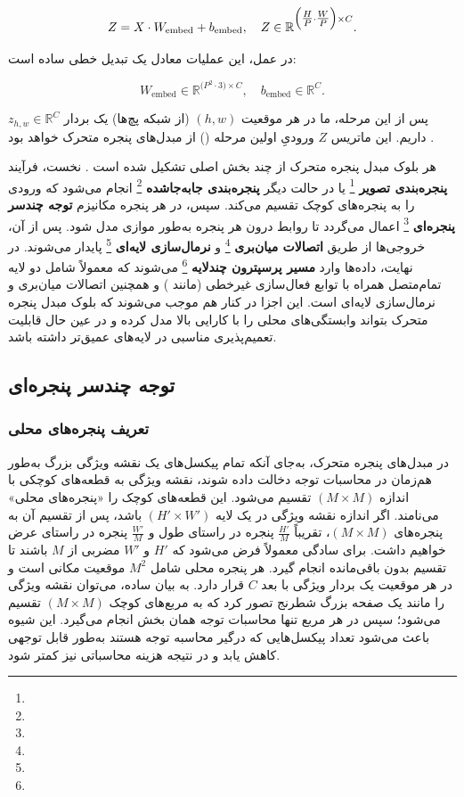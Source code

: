 \begin{equation}
	Z = X \cdot W_{\text{embed}} + b_{\text{embed}},
	\quad
	Z \in \mathbb{R}^{\Bigl(\tfrac{H}{P} \cdot \tfrac{W}{P}\Bigr) \times C}.
\end{equation}

در عمل، این عملیات معادل یک تبدیل خطی ساده است:

\[
W_{\text{embed}} \in \mathbb{R}^{\bigl(P^2 \cdot 3\bigr) \times C},
\quad
b_{\text{embed}} \in \mathbb{R}^{C}.
\]

پس از این مرحله، ما در هر موقعیت \((h, w)\) (از شبکه پچ‌ها) یک بردار
\(\displaystyle z_{h,w} \in \mathbb{R}^{C}\) داریم. این ماتریس \(\displaystyle Z\)
ورودیِ اولین مرحله () از مبدل‌های پنجره متحرک خواهد بود \cite{liu2021swintransformer}.

هر بلوک مبدل پنجره متحرک از چند بخش اصلی تشکیل شده است \cite{liu2021swintransformer}.
نخست، فرآیند \textbf{پنجره‌بندی تصویر} \footnote{} یا در حالت دیگر \textbf{پنجره‌بندی جابه‌جاشده} \footnote{} انجام می‌شود که ورودی را به پنجره‌های کوچک تقسیم می‌کند. سپس، در هر پنجره مکانیزم \textbf{توجه چندسر پنجره‌ای} \footnote{} اعمال می‌گردد تا روابط درون هر پنجره به‌طور موازی مدل شود. پس از آن، خروجی‌ها از طریق \textbf{اتصالات میان‌بری} \footnote{} و \textbf{نرمال‌سازی لایه‌ای} \footnote{} پایدار می‌شوند. در نهایت، داده‌ها وارد \textbf{مسیر پرسپترون چندلایه} \footnote{} می‌شوند که معمولاً شامل دو لایه تمام‌متصل همراه با توابع فعال‌سازی غیرخطی (مانند ) و همچنین اتصالات میان‌بری و نرمال‌سازی لایه‌ای است. این اجزا در کنار هم موجب می‌شوند که بلوک مبدل پنجره متحرک بتواند وابستگی‌های محلی را با کارایی بالا مدل کرده و در عین حال قابلیت تعمیم‌پذیری مناسبی در لایه‌های عمیق‌تر داشته باشد.

\subsection{توجه چندسر پنجره‌ای}

\subsubsection{تعریف پنجره‌های محلی}
در مبدل‌های پنجره متحرک، به‌جای آنکه تمام پیکسل‌های یک نقشه ویژگی بزرگ به‌طور هم‌زمان در محاسبات توجه دخالت داده شوند، نقشه ویژگی به قطعه‌های کوچکی با اندازه \((M \times M)\) تقسیم می‌شود. این قطعه‌های کوچک را «پنجره‌های محلی» می‌نامند. اگر اندازه نقشه ویژگی در یک لایه \((H' \times W')\) باشد، پس از تقسیم آن به پنجره‌های \((M \times M)\)، تقریباً \(\tfrac{H'}{M}\) پنجره در راستای طول و \(\tfrac{W'}{M}\) پنجره در راستای عرض خواهیم داشت. برای سادگی معمولاً فرض می‌شود که \(H'\) و \(W'\) مضربی از \(M\) باشند تا تقسیم بدون باقی‌مانده انجام گیرد. هر پنجره محلی شامل \(M^2\) موقعیت مکانی است و در هر موقعیت یک بردار ویژگی با بعد \(C\) قرار دارد. به بیان ساده، می‌توان نقشه ویژگی را مانند یک صفحه بزرگ شطرنج تصور کرد که به مربع‌های کوچک \((M \times M)\) تقسیم می‌شود؛ سپس در هر مربع تنها محاسبات توجه همان بخش انجام می‌گیرد. این شیوه باعث می‌شود تعداد پیکسل‌هایی که درگیر محاسبه توجه هستند به‌طور قابل توجهی کاهش یابد و در نتیجه هزینه محاسباتی نیز کمتر شود.

